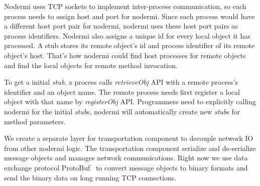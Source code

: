 Nodermi uses TCP sockets to implement inter-process communication,
so each process needs to assign host and port for nodermi.
Since each process would have a different host port pair for nodermi,
nodermi uses these host port pairs as process identifiers.
Nodermi also assigns a unique id for every local object it has processed.
A stub stores its remote object's id and process identifier of its remote object's host.
That's how nodermi could find host processes for remote objects and
find the local objects for remote method invocation.

To get a initial \emph{stub}, a process 
calls \emph{retrieveObj} API with a remote process's identifier and 
an object name.
The remote process needs first register a local object with that name by
\emph{registerObj} API.
Programmers need to explicitly calling nodermi for the initial \emph{stub}s,
nodermi will automatically create new \emph{stub}s for method parameters.


We create a separate layer for transportation component to decouple network
IO from other nodermi logic.
The transportation component serialize and de-serialize message objects
and manages network communications.
Right now we use data exchange protocol ProtoBuf~\cite{protobuf} to convert message objects to binary
formats and send the binary data on long running TCP connections.



\nodrmimethodinvokefig{}
\nodrmicallbackfig{}

